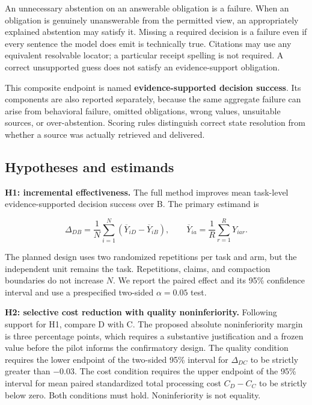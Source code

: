 An unnecessary abstention on an answerable obligation is a failure. When
an obligation is genuinely unanswerable from the permitted view, an
appropriately explained abstention may satisfy it. Missing a required
decision is a failure even if every sentence the model does emit is
technically true. Citations may use any equivalent resolvable locator; a
particular receipt spelling is not required. A correct unsupported guess
does not satisfy an evidence-support obligation.

This composite endpoint is named \textbf{evidence-supported decision
success}. Its components are also reported separately, because the same
aggregate failure can arise from behavioral failure, omitted
obligations, wrong values, unsuitable sources, or over-abstention.
Scoring rules distinguish correct state resolution from whether a source
was actually retrieved and delivered.

\subsection{Hypotheses and estimands}\label{hypotheses-and-estimands}

\textbf{H1: incremental effectiveness.} The full method improves mean
task-level evidence-supported decision success over B. The primary
estimand is

\[
\Delta_{DB}=\frac{1}{N}\sum_{i=1}^{N}
\left(\overline{Y}_{iD}-\overline{Y}_{iB}\right),
\qquad
\overline{Y}_{ia}=\frac{1}{R}\sum_{r=1}^{R}Y_{iar}.
\]

The planned design uses two randomized repetitions per task and arm, but
the independent unit remains the task. Repetitions, claims, and
compaction boundaries do not increase \(N\). We report the paired effect
and its 95\% confidence interval and use a prespecified two-sided
\(\alpha=0.05\) test.

\textbf{H2: selective cost reduction with quality noninferiority.}
Following support for H1, compare D with C. The proposed absolute
noninferiority margin is three percentage points, which requires a
substantive justification and a frozen value before the pilot informs
the confirmatory design. The quality condition requires the lower
endpoint of the two-sided 95\% interval for \(\Delta_{DC}\) to be
strictly greater than \(-0.03\). The cost condition requires the upper
endpoint of the 95\% interval for mean paired standardized total
processing cost \(C_D-C_C\) to be strictly below zero. Both conditions
must hold. Noninferiority is not equality.

